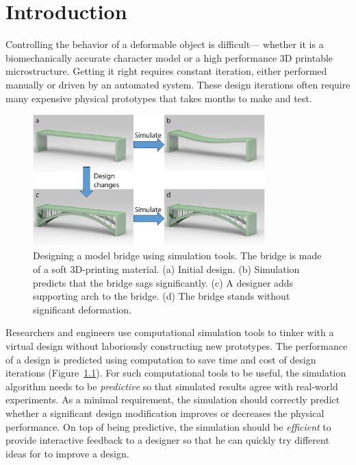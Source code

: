 \chapter{Introduction}
Controlling the behavior of a deformable object is difficult---
whether it is a biomechanically accurate character model or a high performance
3D printable microstructure.
Getting it right requires constant iteration, either performed manually or driven by an automated system.
These design iterations often require many expensive physical prototypes that takes months to make and test.
\begin{figure}[!htbp]
	\centering
	\includegraphics[width=0.8\textwidth]{images/bridgeDesign.png}
	\caption{Designing a model bridge using simulation tools.
		The bridge is made of a soft 3D-printing material. (a) Initial design.
		(b) Simulation predicts that the bridge sags significantly.
		(c) A designer adds supporting arch to the bridge.
		(d) The bridge stands without significant deformation.}
	\label{fig:bridgeDesign}
\end{figure}

Researchers and engineers use computational simulation tools to tinker with a virtual design without laboriously constructing new prototypes.
The performance of a design is predicted using computation to save time and cost of design iterations (Figure~\ref{fig:bridgeDesign}).
For such computational tools to be useful, the simulation algorithm needs to be \textit{predictive} so that simulated results agree with real-world experiments.
As a minimal requirement, the simulation should correctly predict whether a significant design modification improves or decreases the physical performance.
On top of being predictive, the simulation should be \textit{efficient} to provide interactive feedback to a designer so that he can quickly try different ideas for to improve a design.

